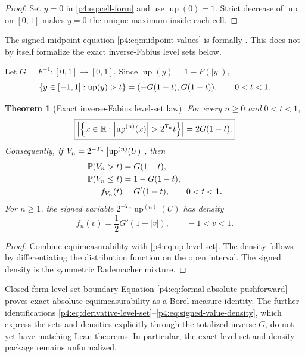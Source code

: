 \documentclass[11pt,oneside]{article}
\newtheorem{theorem}{Theorem}[section]
\theoremstyle{definition}
\theoremstyle{remark}
\newcommand{\R}{\mathbb R}
\newcommand{\Up}{\operatorname{up}}
\begin{document}
\begin{proof}
Set $y=0$ in \eqref{p4:eq:cell-form} and use $\Up(0)=1$.  Strict decrease of $\Up$ on
$[0,1]$ makes $y=0$ the unique maximum inside each cell.
\end{proof}

The signed midpoint equation \eqref{p4:eq:midpoint-values} is formally
.  This does not by itself formalize the exact
inverse-Fabius level sets below.

Let $G=F^{-1}:[0,1]\to[0,1]$.  Since $\Up(y)=1-F(|y|)$,
\begin{equation}
 \set{y\in[-1,1]:\Up(y)>t}=(-G(1-t),G(1-t)),\qquad0<t<1.
 \label{p4:eq:up-level-set}
\end{equation}

\begin{theorem}[Exact inverse-Fabius level-set law]
\label{p4:thm:level-set-law}
For every $n\geq0$ and $0<t<1$,
\begin{equation}
 \boxed{
 \left|\set{x\in\R:
 \abs{\Up^{(n)}(x)}>2^{T_n}t}\right|
 =2G(1-t).}
 \label{p4:eq:derivative-level-set}
\end{equation}
Consequently, if $V_n=2^{-T_n}\abs{\Up^{(n)}(U)}$, then
\begin{align}
 \mathbb P(V_n>t)&=G(1-t),\label{p4:eq:V-tail}\\
 \mathbb P(V_n\leq t)&=1-G(1-t),\label{p4:eq:V-cdf}\\
 f_{V_n}(t)&=G'(1-t),\qquad0<t<1.
 \label{p4:eq:V-density}
\end{align}
For $n\geq1$, the signed variable $2^{-T_n}\Up^{(n)}(U)$ has density
\begin{equation}
 f_n(v)=\frac12G'(1-|v|),\qquad-1<v<1.
 \label{p4:eq:signed-value-density}
\end{equation}
\end{theorem}

\begin{proof}
Combine equimeasurability with \eqref{p4:eq:up-level-set}.  The density follows by
differentiating the distribution function on the open interval.  The signed density is the
symmetric Rademacher mixture.
\end{proof}

\begin{statusbox}{Closed-form level-set boundary}
Equation \eqref{p4:eq:formal-absolute-pushforward} proves exact absolute equimeasurability as
a Borel measure identity.  The further identifications
\eqref{p4:eq:derivative-level-set}--\eqref{p4:eq:signed-value-density}, which express the sets
and densities explicitly through the totalized inverse \(G\), do not yet have matching Lean
theorems.  In particular, the exact level-set and density package remains unformalized.
\end{statusbox}
\end{document}
